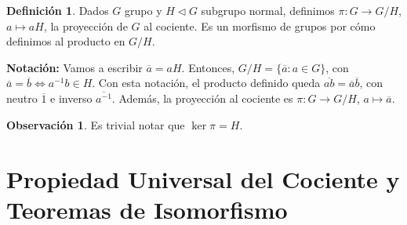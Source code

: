 \documentclass[12pt]{book}
\theoremstyle{definition}
\newtheorem{obs}[teo]{Observación}
\newtheorem{defn}[teo]{Definición}
\begin{document}
\begin{defn}
Dados $G$ grupo y $H\triangleleft G$ subgrupo normal, definimos $\pi:G\to G/H$, $a\mapsto aH$, la proyección de $G$ al cociente. Es un morfismo de grupos por cómo definimos al producto en $G/H$.
\end{defn}

\textbf{Notación:} Vamos a escribir $\overline{a} = aH$. Entonces, $G/H = \{\overline{a}:a\in G\}$, con $\overline{a} = \overline{b} \Longleftrightarrow a^{-1}b\in H$. Con esta notación, el producto definido queda $\overline{ab} = \overline{a}\overline{b}$, con neutro $\overline{1}$ e inverso $\overline{a^{-1}}$. Además, la proyección al cociente es $\pi:G\to G/H$, $a\mapsto \overline{a}$.

\begin{obs}
Es trivial notar que $\ker \pi = H$.
\end{obs}

\section{Propiedad Universal del Cociente y Teoremas de Isomorfismo}
\end{document}
